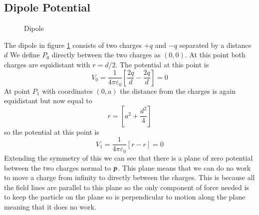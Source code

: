 \documentclass{article}
\begin{document}
    \subsection{Dipole Potential}
    \begin{figure}[ht]
        \centering
        \caption{Dipole}
        \label{fig:dipole}
    \end{figure}
    The dipole in figure \ref{fig:dipole} consists of two charges \(+q\) and \(-q\) separated by a distance \(d\)
    We define \(P_0\) directly between the two charges as \((0, 0)\).
    At this point both charges are equidistant with \(r = d/2\).
    The potential at this point is
    \[V_0 = \frac{1}{4\pi\varepsilon_0}\left[\frac{2q}{d} - \frac{2q}{d}\right] = 0\]
    At point \(P_1\) with coordinates \((0, a)\) the distance from the charges is again equidistant but now equal to
    \[r = \left[a^2 + \frac{d^2}{4}\right]\]
    so the potential at this point is
    \[V_1 = \frac{1}{4\pi\varepsilon_0}[r - r] = 0\]
    Extending the symmetry of this we can see that there is a plane of zero potential between the two charges normal to \(\bm{p}\).
    This plane means that we can do no work to move a charge from infinity to directly between the charges.
    This is because all the field lines are parallel to this plane so the only component of force needed is to keep the particle on the plane so is perpendicular to motion along the plane meaning that it does no work.
    
\end{document}
